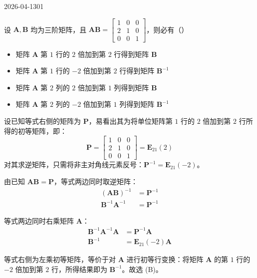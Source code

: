 \begin{mistake}{2026-04-13}{01}

\begin{problemcontent}
设 \(\mathbf{A}, \mathbf{B}\) 均为三阶矩阵，且 \(\mathbf{A}\mathbf{B} = \begin{bmatrix} 1 & 0 & 0 \\ 2 & 1 & 0 \\ 0 & 0 & 1 \end{bmatrix}\)，则必有（\quad）
\begin{itemize}
 \item[(A)] 矩阵 \(\mathbf{A}\) 第 \(1\) 行的 \(2\) 倍加到第 \(2\) 行得到矩阵 \(\mathbf{B}\)
 \item[(B)] 矩阵 \(\mathbf{A}\) 第 \(1\) 行的 \(-2\) 倍加到第 \(2\) 行得到矩阵 \(\mathbf{B}^{-1}\)
 \item[(C)] 矩阵 \(\mathbf{A}\) 第 \(2\) 列的 \(2\) 倍加到第 \(1\) 列得到矩阵 \(\mathbf{B}\)
 \item[(D)] 矩阵 \(\mathbf{A}\) 第 \(2\) 列的 \(-2\) 倍加到第 \(1\) 列得到矩阵 \(\mathbf{B}^{-1}\)
\end{itemize}
\end{problemcontent}

\begin{solutioncontent}
设已知等式右侧的矩阵为 \(\mathbf{P}\)，易看出其为将单位矩阵第 \(1\) 行的 \(2\) 倍加到第 \(2\) 行所得的初等矩阵，即：
\[
\mathbf{P} = \begin{bmatrix} 1 & 0 & 0 \\ 2 & 1 & 0 \\ 0 & 0 & 1 \end{bmatrix} = \mathbf{E}_{21}(2)
\]
对其求逆矩阵，只需将非主对角线元素反号：\(\mathbf{P}^{-1} = \mathbf{E}_{21}(-2)\)。

由已知 \(\mathbf{A}\mathbf{B} = \mathbf{P}\)，等式两边同时取逆矩阵：
\[
\begin{aligned}
(\mathbf{A}\mathbf{B})^{-1} &= \mathbf{P}^{-1} \\
\mathbf{B}^{-1}\mathbf{A}^{-1} &= \mathbf{P}^{-1}
\end{aligned}
\]

等式两边同时右乘矩阵 \(\mathbf{A}\)：
\[
\begin{aligned}
\mathbf{B}^{-1}\mathbf{A}^{-1}\mathbf{A} &= \mathbf{P}^{-1}\mathbf{A} \\
\mathbf{B}^{-1} &= \mathbf{E}_{21}(-2)\mathbf{A}
\end{aligned}
\]

等式右侧为左乘初等矩阵，等价于对 \(\mathbf{A}\) 进行初等行变换：将矩阵 \(\mathbf{A}\) 的第 \(1\) 行的 \(-2\) 倍加到第 \(2\) 行，所得结果即为 \(\mathbf{B}^{-1}\)。故选 (B)。
\end{solutioncontent}


\end{mistake}
